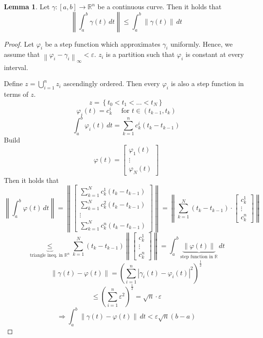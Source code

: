 \documentclass[a4paper,landscape,twocolumn]{article}
\theoremstyle{definition}
\newtheorem{lemma}{Lemma}
\newcommand\set[1]{\left\{#1\right\}}
\newcommand\abs[1]{\left|#1\right|}
\newcommand\norm[1]{\left\|#1\right\|}
\newcommand\inorm[1]{\left\|#1\right\|_\infty}
\begin{document}
\begin{lemma}
  Let $\gamma: [a,b] \to \mathbb R^n$ be a continuous curve.
  Then it holds that
  \[ \norm{\int_a^b \gamma(t) \, dt} \leq \int_a^b \norm{\gamma(t)} \, dt \]
\end{lemma}
\begin{proof}
  Let $\varphi_i$ be a step function which approximates $\gamma_i$ uniformly.
  Hence, we assume that $\inorm{\varphi_i - \gamma_i} < \varepsilon$.
  $z_i$ is a partition such that $\varphi_i$ is constant at every interval.

  Define $z = \bigcup_{i=1}^n z_i$ ascendingly ordered.
  Then every $\varphi_i$ is also a step function in terms of $z$.
  \[ z = \set{t_0 < t_1 < \ldots < t_N} \]
  \[ \varphi_i(t) = c^i_k \quad \text{ for } t \in (t_{k-1}, t_k) \]
  \[ \int_a^b \varphi_i(t) \, dt = \sum_{k=1}^n c_k^i (t_k - t_{k-1}) \]
  Build
  \[
    \varphi(t) = \begin{bmatrix}
      \varphi_1(t) \\
      \vdots \\
      \varphi_N(t)
    \end{bmatrix}
  \]
  Then it holds that
  \[
    \norm{\int_a^b \varphi(t) \, dt} = \norm{
      \begin{bmatrix}
        \sum_{k=1}^N c_k^1 (t_k - t_{k-1}) \\
        \sum_{k=1}^N c_k^2 (t_k - t_{k-1}) \\
        \vdots \\
        \sum_{k=1}^N c_k^n (t_k - t_{k-1})
      \end{bmatrix}
    } = \norm{\sum_{k=1}^N (t_k - t_{k-1}) \cdot \begin{bmatrix} c_k^1 \\ \vdots \\ c_k^n \end{bmatrix}}
  \] \[
    \underbrace{\leq}_{\text{triangle ineq. in } \mathbb R^n} \sum_{k=1}^N (t_k - t_{k-1})
    \norm{\begin{bmatrix} c_k^1 \\ \vdots \\ c_k^n \end{bmatrix}}
    = \int_a^b \underbrace{\norm{\varphi(t)}}_{\text{step function in } \mathbb R} \, dt
  \] \[
    \norm{\gamma(t) - \varphi(t)} = \left(\sum_{i=1}^n \abs{\gamma_i(t) - \varphi_i(t)}^2\right)^{\frac12}
  \] \[
    \leq \left(\sum_{i=1}^n \varepsilon^2\right)^{\frac12} = \sqrt{n} \cdot \varepsilon
  \] \[
    \Rightarrow \int_a^b \norm{\gamma(t) - \varphi(t)} \, dt < \varepsilon \sqrt{n} (b - a)
\]
\end{proof}
\end{document}
